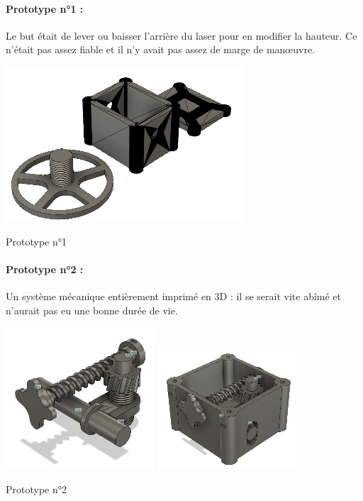 \paragraph{Prototype n°1 :}
Le but était de lever ou baisser l’arrière du laser pour en modifier la hauteur. Ce n'était pas assez fiable et il n'y avait pas assez de marge de manœuvre.
\begin{center}
    \includegraphics{photoHugo/image005}
    
    Prototype n°1 
\end{center}

\paragraph{Prototype n°2 :}
Un système mécanique entièrement imprimé en 3D : il se serait vite abîmé et n’aurait pas eu une bonne durée de vie.
\begin{center}
    \includegraphics{photoHugo/image007}
    \includegraphics{photoHugo/image009}
    
    Prototype n°2
\end{center}

